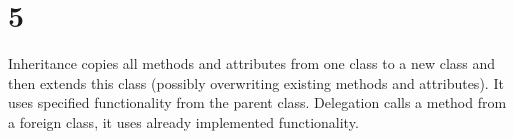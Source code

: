 \documentclass[11pt,a4paper]{article}
\begin{document}
\section*{5}

Inheritance copies all methods and attributes from one class to a new
class and then extends this class (possibly overwriting existing methods
and attributes). It uses specified functionality from the parent class.
Delegation calls a method from a foreign class, it uses already
implemented functionality.
\end{document}
